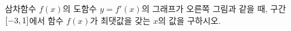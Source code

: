 \noindent\begin{minipage}[t]{0.58\linewidth}\vspace{0pt}\raggedright 삼차함수 $f(x)$의 도함수 $y=f'(x)$의 그래프가 오른쪽 그림과 같을 때, 구간 $[-3{,}\mkern3mu\mathopen{}1]$에서 함수 $f(x)$가 최댓값을 갖는 $x$의 값을 구하시오.\end{minipage}\hfill\begin{minipage}[t]{0.4\linewidth}\vspace{0pt}\centering \resizebox{\ifdim\width>\linewidth\linewidth\else\width\fi}{!}{}\end{minipage}\par
